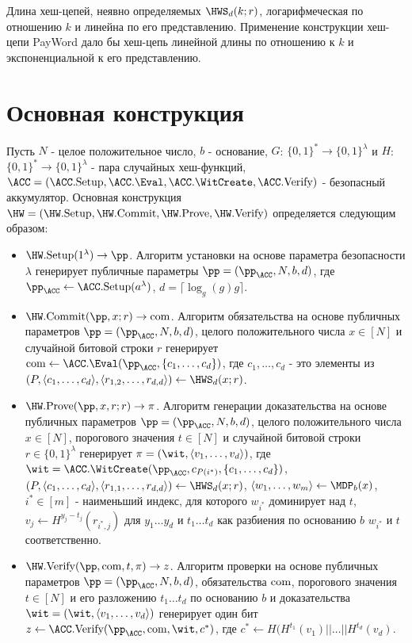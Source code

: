 Длина хеш-цепей, неявно определяемых $\HWS_d(k; r)$, логарифмеческая по отношению $k$ и линейна по его представлению.
Применение конструкции хеш-цепи PayWord \cite{10.1007/3-540-62494-5_6} дало бы хеш-цепь линейной длины по отношению к $k$ и экспоненциальной к его представлению.

\section{Основная конструкция} %
\begin{definition}
	Пусть $N$ - целое положительное число, $b$ - основание, $G$: $\{0, 1\}^* \rightarrow \{0, 1\}^\lambda$ и $H$: $\{0, 1\}^* \rightarrow \{0, 1\}^\lambda$ - пара случайных хеш-функций, $\ACC = (\ACC.\Setup, \ACC.\Eval, \ACC.\WitCreate, \ACC.\Verify)$ - безопасный аккумулятор.
	Основная конструкция $\HW = (\HW.\Setup, \HW.\Commit, \HW.\Prove, \HW.\Verify)$ определяется следующим образом:
	\begin{itemize}
		\item $\HW.\Setup(1^\lambda) \rightarrow \pp$. Алгоритм установки на основе параметра безопасности $\lambda$ генерирует публичные параметры $\pp = (\pp_\ACC, N, b, d)$, где $\pp_\ACC \leftarrow \ACC.\Setup(a^\lambda)$, $d = \lceil \log_g(g)g\rceil$.
		\item $\HW.\Commit(\pp, x; r) \rightarrow \com$. Алгоритм обязательства на основе публичных параметров $\pp = (\pp_\ACC, N, b, d)$, целого положительного числа $x \in [N]$ и случайной битовой строки $r$ генерирует $\com \leftarrow \ACC.\Eval(\pp_\ACC, \{c_1, \dots, c_d\})$, где $c_1, \dots, c_d$ - это элементы из $(P, \langle c_1, \dots, c_d \rangle, \langle r_{1, 2}, \dots, r_{d, d} \rangle) \leftarrow \HWS_d(x; r)$.
		\item $\HW.\Prove(\pp, x, r; r) \rightarrow \pi$. Алгоритм генерации доказательства на основе публичных параметров $\pp = (\pp_\ACC, N, b, d)$, целого положительного числа $x \in [N]$, порогового значения $t \in [N]$ и случайной битовой строки $r \in \{0, 1\}^\lambda$ генерирует $\pi = (\wit, \langle v_1, \dots, v_d \rangle)$, где $\wit = \ACC.\WitCreate(\pp_\ACC, c_{P(i^*)}, \{c_1, \dots, c_d\})$, $(P, \langle c_1, \dots, c_d \rangle, \langle r_{1, 1}, \dots, r_{d, d} \rangle) \leftarrow \HWS_d(x; r)$, $\langle w_1, \dots, w_m \rangle \leftarrow \MDP_b(x)$, $i^* \in [m]$ - наименьший индекс, для которого $w_{i^*}$ доминирует над $t$, $v_j \leftarrow H^{y_j - t_j}(r_{i^*, j})$ для $y_1 \dots y_d$ и $t_1 \dots t_d$ как разбиения по основанию $b$ $w_{i^*}$ и $t$ соответственно.
		\item $\HW.\Verify(\pp, \com, t, \pi) \rightarrow z$. Алгоритм проверки на основе публичных параметров $\pp = (\pp_\ACC, N, b, d)$, обязательства $\text{com}$, порогового значения $t \in [N]$ и его разложению $t_1 \dots t_d$ по основанию $b$ и доказательства $\wit = (\wit, \langle v_1, \dots, v_d \rangle)$ генерирует один бит $z \leftarrow \ACC.\Verify(\pp_\ACC, \com, \wit, c^*)$, где $c^* \leftarrow H(H^{t_1}(v_1) || \dots || H^{t_d}(v_d)$.
	\end{itemize}
\end{definition}

